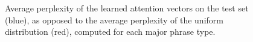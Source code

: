 \documentclass[11pt]{article}
\newcommand{\ask}[1]{\textcolor{orange}{{\textbf{[#1 --\textsc{ask}]}}}}
\newcommand{\nascomment}[1]{\textcolor{blue}{{\textbf{[#1 --\textsc{nas}]}}}}
\newcommand{\miguelcomment}[1]{\textcolor{red}{{\textbf{[#1 --\textsc{miguel}]}}}}
\renewcommand{\ask}[1]{}
\renewcommand{\nascomment}[1]{}
\renewcommand{\miguelcomment}[1]{}
\begin{document}
\begin{figure}[!h]
\centering
{}
\caption{Average perplexity of the learned attention vectors on the test set (blue), as opposed to the average perplexity of the uniform distribution (red), computed for each major phrase type. \nascomment{perplexity, or entropy?} }
\label{fig:entropy}
\end{figure}


\end{document}
